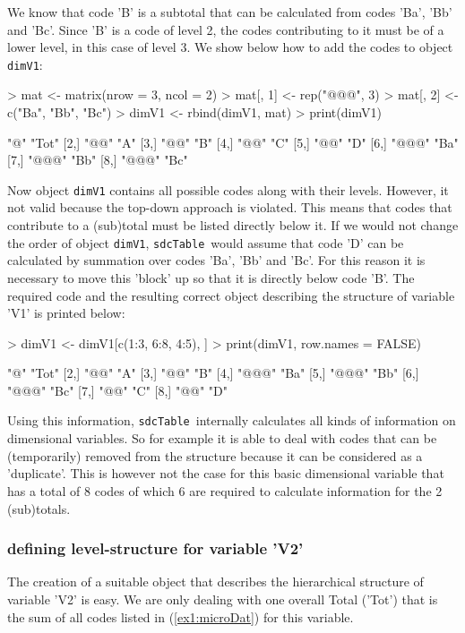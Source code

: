 \documentclass{article}
\newcommand{\sdcTable}{{\tt sdcTable}}
\begin{document}
We know that code 'B' is a subtotal that can be calculated from codes
'Ba', 'Bb' and 'Bc'. Since 'B' is a code of level 2, the codes contributing to
it must be of a lower level, in this case of level 3. We show below how to add
the codes to object {\tt dimV1}:

\begin{Schunk}
\begin{Sinput}
> mat <- matrix(nrow = 3, ncol = 2)
> mat[, 1] <- rep("@@@", 3)
> mat[, 2] <- c("Ba", "Bb", "Bc")
> dimV1 <- rbind(dimV1, mat)
> print(dimV1)
\end{Sinput}
\begin{Soutput}
     [,1]  [,2] 
[1,] "@"   "Tot"
[2,] "@@"  "A"  
[3,] "@@"  "B"  
[4,] "@@"  "C"  
[5,] "@@"  "D"  
[6,] "@@@" "Ba" 
[7,] "@@@" "Bb" 
[8,] "@@@" "Bc" 
\end{Soutput}
\end{Schunk}
Now object {\tt dimV1} contains all possible codes along with their levels. However,
it not valid because the top-down approach is violated. This means that codes that
contribute to a (sub)total must be listed directly below it. If we would not change
the order of object {\tt dimV1}, \sdcTable~would assume that code 'D' can be calculated
by summation over codes 'Ba', 'Bb' and 'Bc'. For this reason it is necessary to
move this 'block' up so that it is directly below code 'B'. The required code 
and the resulting correct object describing the structure of variable 'V1' is 
printed below:
\begin{Schunk}
\begin{Sinput}
> dimV1 <- dimV1[c(1:3, 6:8, 4:5), ]
> print(dimV1, row.names = FALSE)
\end{Sinput}
\begin{Soutput}
     [,1]  [,2] 
[1,] "@"   "Tot"
[2,] "@@"  "A"  
[3,] "@@"  "B"  
[4,] "@@@" "Ba" 
[5,] "@@@" "Bb" 
[6,] "@@@" "Bc" 
[7,] "@@"  "C"  
[8,] "@@"  "D"  
\end{Soutput}
\end{Schunk}

Using this information, \sdcTable~internally calculates all kinds of information
on dimensional variables. So for example it is able to deal with codes that can
be (temporarily) removed from the structure because it can be considered as a
'duplicate'. This is however not the case for this basic dimensional variable
that has a total of 8 codes of which 6 are required to calculate information
for the 2 (sub)totals.

\subsubsection*{defining level-structure for variable 'V2'}
The creation of a suitable object that describes the hierarchical structure
of variable 'V2' is easy. We are only dealing with one overall Total ('Tot')
that is the sum of all codes listed in (\ref{ex1:microDat}) for this variable.\\
\end{document}
